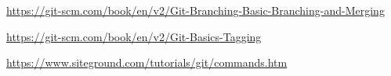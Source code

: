\begin{thebibliography}{99999}
\singlespace\normalsize

 \url{https://git-scm.com/book/en/v2/Git-Branching-Basic-Branching-and-Merging}


 \url{https://git-scm.com/book/en/v2/Git-Basics-Tagging}

 \url{https://www.siteground.com/tutorials/git/commands.htm}


\end{thebibliography}